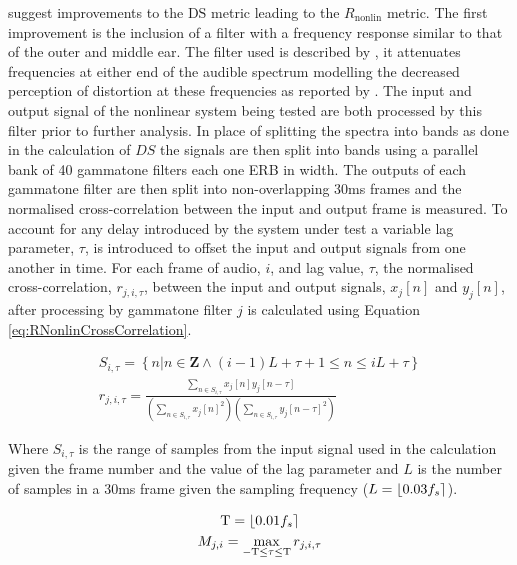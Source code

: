 		\citet{tan2004predicting} suggest improvements to the $\mathrm{DS}$ metric leading to the
		$R_{\mathrm{nonlin}}$ metric. The first improvement is the inclusion of a filter with a frequency response
		similar to that of the outer and middle ear. The filter used is described by \citet{glasberg2002a}, it
		attenuates frequencies at either end of the audible spectrum modelling the decreased perception of
		distortion at these frequencies as reported by \citet{voishvillo2006assessment}. The input and output signal
		of the nonlinear system being tested are both processed by this filter prior to further analysis. In place
		of splitting the spectra into bands as done in the calculation of $DS$ the signals are then split into bands
		using a parallel bank of 40 gammatone filters each one ERB in width. The outputs of each gammatone filter
		are then split into non-overlapping 30ms frames and the normalised cross-correlation between the input and
		output frame is measured. To account for any delay introduced by the system under test a variable lag
		parameter, $\tau$, is introduced to offset the input and output signals from one another in time. For each
		frame of audio, $i$, and lag value, $\tau$, the normalised cross-correlation, $r_{j,i,\tau}$, between the
		input and output signals, $x_{j}[n]$ and $y_{j}[n]$, after processing by gammatone filter $j$ is calculated
		using Equation \ref{eq:RNonlinCrossCorrelation}.

		\begin{gather}
			S_{i,\tau} = \left\{ n | n \in \mathbf{Z} 
				     \land (i-1)L+\tau+1 \leq n \leq iL + \tau \right\} \nonumber \\
			r_{j,i,\tau} = \frac{\sum_{n \in S_{i,\tau}} x_{j}[n]y_{j}[n-\tau]}
				{\left( \sum_{n \in S_{i,\tau}} x_{j}[n]^{2} \right) 
				\left( \sum_{n \in S_{i,\tau}} y_{j}[n-\tau]^{2} \right)}
			\label{eq:RNonlinCrossCorrelation}
		\end{gather}

		Where $S_{i,\tau}$ is the range of samples from the input signal used in the calculation given the frame
		number and the value of the lag parameter and $L$ is the number of samples in a 30ms frame given the
		sampling frequency ($L = \left\lfloor0.03f_{s}\right\rceil$).

		\begin{gather}
			\mathrm{T} = \left\lfloor0.01f_{s}\right\rceil \nonumber \\
			M_{j,i} = \max_{-\mathrm{T} \leq \tau \leq \mathrm{T}} r_{j,i,\tau}
			\label{eq:RNonlinCrossCorrelation}
		\end{gather}

